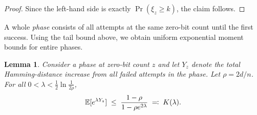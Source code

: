 \documentclass[lettersize,journal]{IEEEtran}
\newcommand{\EE}{\mathbb{E}}
\newtheorem{lemma}{Lemma}
\begin{document}
{\begin{proof}
	
	Since the left-hand side is exactly $\Pr(\xi_z\ge k)$, the claim follows.
\end{proof}


A whole \emph{phase} consists of all attempts at the same zero-bit count until the 
first success.  
Using the tail bound above, we obtain uniform exponential moment bounds for 
entire phases.

\begin{lemma}\label{lem:phase-mgf}
	Consider a phase at zero-bit count $z$ and let $Y_z$ denote the total 
	Hamming-distance increase from all failed attempts in the phase.  
	Let $\rho = 2d/n$.  
	For all $0<\lambda<\tfrac12\ln\frac{1}{2\rho}$,
	\[
	\EE[e^{\lambda Y_z}] 
	\;\le\; 
	\textcolor{black}{\frac{1-\rho}{1-\rho e^{2\lambda}}
	\;\eqqcolon\; K(\lambda).}
	\]
\end{lemma}

}
\end{document}
